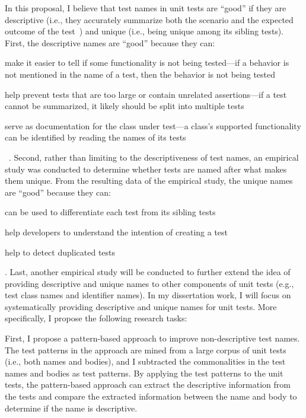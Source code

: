 \documentclass[proposal.tex]{subfiles}
\begin{document}
In this proposal, I believe that test names in unit tests are \enquote{good} if they are descriptive (i.e., they accurately summarize both the scenario and the expected outcome of the test~\cite{trenk14}) and unique (i.e., being unique among its sibling tests).
%
First, the descriptive names are \enquote{good} because they can:
\begin{enumerate*}
\item make it easier to tell if some functionality is not being tested---if a behavior is not mentioned in the name of a test, then the behavior is not being tested
\item help prevent tests that are too large or contain unrelated assertions---if a test cannot be summarized, it likely should be split into multiple tests
\item serve as documentation for the class under test---a class's supported functionality can be identified by reading the names of its tests
\end{enumerate*}~\cite{zhang2015automatically}.
%
Second, rather than limiting to the descriptiveness of test names, an empirical study was conducted to determine whether tests are named after what makes them unique.
%
From the resulting data of the empirical study, the unique names are \enquote{good} because they can:
\begin{enumerate*}
\item can be used to differentiate each test from its sibling tests
\item help developers to understand the intention of creating a test
\item help to detect duplicated tests
\end{enumerate*}.
%
Last, another empirical study will be conducted to further extend the idea of providing descriptive and unique names to other components of unit tests (e.g., test class names and identifier names).
%
In my dissertation work, I will focus on systematically providing descriptive and unique names for unit tests.
%
More specifically, I propose the following research tasks:


First, I propose a pattern-based approach to improve non-descriptive test names.
%
The test patterns in the approach are mined from a large corpus of unit tests (i.e., both names and bodies), and I subtracted the commonalities in the test names and bodies as test patterns.
%
By applying the test patterns to the unit tests, the pattern-based approach can extract the descriptive information from the tests and compare the extracted information between the name and body to determine if the name is descriptive.
\end{document}
